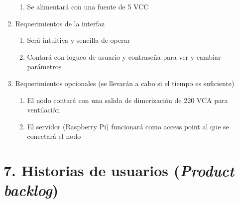 \documentclass[
11pt, %
]{charter}
\begin{document}
\begin{enumerate}
\begin{enumerate}
			\item Se alimentará con una fuente de 5 VCC
		\end{enumerate}
	\item Requerimientos de la interfaz
		\begin{enumerate}
			\item Será intuitiva y sencilla de operar
			\item Contará con logueo de usuario y contraseña para ver y cambiar parámetros
		\end{enumerate}
	\item Requerimientos opcionales (se llevarán a cabo si el tiempo es suficiente)
		\begin{enumerate}
			\item El nodo contará con una salida de dimerización de 220 VCA para ventilación
			\item El servidor (Raspberry Pi) funcionará como access point al que se conectará el nodo
		\end{enumerate}
\end{enumerate}

\section{7. Historias de usuarios (\textit{Product backlog})}
\label{sec:backlog}
\end{document}
